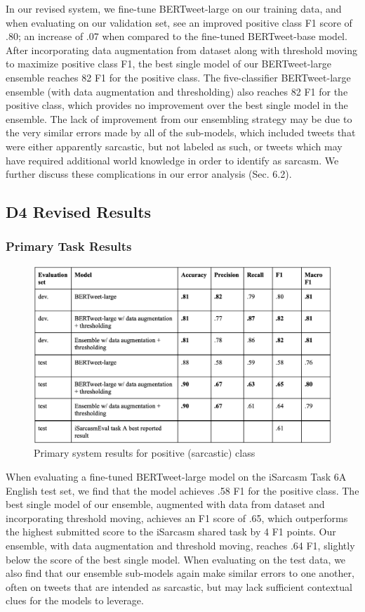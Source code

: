 \documentclass[11pt]{article}
\begin{document}
In our revised system, we fine-tune BERTweet-large on our training data, and when evaluating on our validation set, see an improved positive class F1 score of .80; an increase of .07 when compared to the fine-tuned BERTweet-base model. After incorporating data augmentation from \citealp{Ptcek2014SarcasmDO} dataset along with threshold moving to maximize positive class F1, the best single model of our BERTweet-large ensemble reaches 82 F1 for the positive class. The five-classifier BERTweet-large ensemble (with data augmentation and thresholding) also reaches 82 F1 for the positive class, which provides no improvement over the best single model in the ensemble. The lack of improvement from our ensembling strategy may be due to the very similar errors made by all of the sub-models, which included tweets that were either apparently sarcastic, but not labeled as such, or tweets which may have required additional world knowledge in order to identify as sarcasm. We further discuss these complications in our error analysis (Sec. 6.2). 

\subsection{D4 Revised Results}
\subsubsection{Primary Task Results}
\begin{figure}[h!]
    \includegraphics[width=.5\textwidth]{Primary system results for positive (sarcastic) class.png}
    \caption{Primary system results for positive (sarcastic) class}
\end{figure}

When evaluating a fine-tuned BERTweet-large model on the iSarcasm Task 6A English test set, we find that the model achieves .58 F1 for the positive class. The best single model of our ensemble, augmented with data from \citealp{Ptcek2014SarcasmDO} dataset and incorporating threshold moving, achieves an F1 score of .65, which outperforms the highest submitted score to the iSarcasm shared task by 4 F1 points. Our ensemble, with data augmentation and threshold moving, reaches .64 F1, slightly below the score of the best single model. When evaluating on the test data, we also find that our ensemble sub-models again make similar errors to one another, often on tweets that are intended as sarcastic, but may lack sufficient contextual clues for the models to leverage.  
\end{document}
